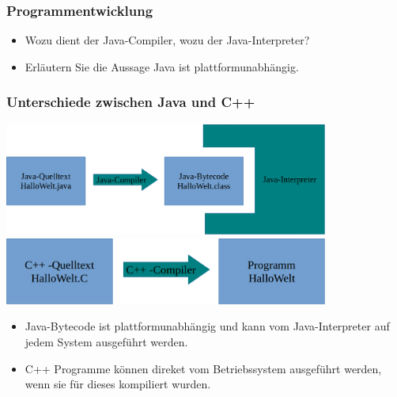 \begin{frame}[t]%
\frametitle{Programmentwicklung}
\smallskip

\begin{itemize}
\item Wozu dient der Java-Compiler, wozu der Java-Interpreter?
\item Erläutern Sie die Aussage \glqq Java ist plattformunabhängig\grqq.
\end{itemize}

\end{frame}

\begin{frame}[t]%
  \frametitle{Unterschiede zwischen Java und C++}%
\centering
\medskip

\includegraphics[width=0.8\textwidth]{grundl-java/Java-Kompiler}\\[2em]

\includegraphics[width=0.8\textwidth]{grundl-java/C++-Kompiler}

\begin{itemize}
 \item Java-Bytecode ist plattformunabhängig und kann vom Java-Interpreter auf jedem System ausgeführt werden.
 \item C++ Programme können direket vom Betriebssystem ausgeführt werden, wenn sie für dieses kompiliert wurden.
\end{itemize}

\end{frame}
